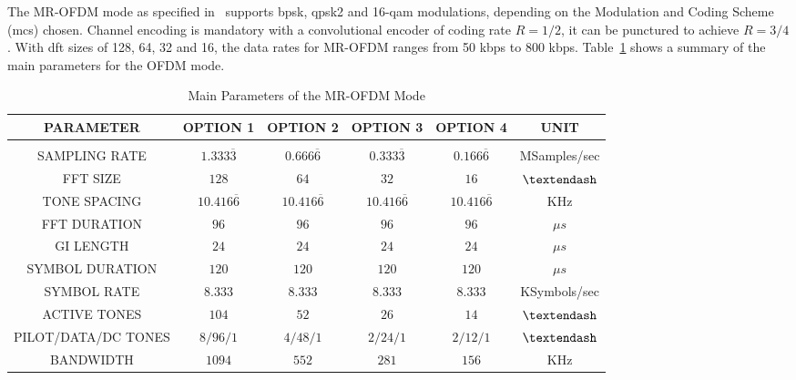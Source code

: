 The MR-OFDM mode as specified in~\cite{sun_std_2012} supports \ac{bpsk}, \ac{qpsk2} and 16-\ac{qam} modulations, depending on the Modulation and Coding Scheme (\ac{mcs}) chosen. Channel encoding is mandatory with a convolutional encoder of coding rate $R =1/2$, it can be punctured to achieve $R = 3/4$. With  \ac{dft} sizes of 128, 64, 32 and 16, the data rates for MR-OFDM ranges from 50 kbps to 800 kbps. Table~\ref{table_mrofdm} shows a summary of the main parameters for the OFDM mode. 

\begin{table}[htb!]\footnotesize
\caption{Main Parameters of the MR-OFDM Mode}
\label{table_mrofdm}
\centering
\begin{tabular}{@{}c c c c c c}
\hline
\textbf{PARAMETER}	&\textbf{OPTION 1}	&\textbf{OPTION 2}	&\textbf{OPTION 3}	&\textbf{OPTION 4}	&\textbf{UNIT}\\
\hline\\
SAMPLING RATE		&$1.333\overline{3}$	&$0.666\overline{6}$	&$0.333\overline{3}$ 	&$0.166\overline{6}$	&MSamples/sec\\
FFT SIZE		&$128$			&$64$			&$32$			&$16$			&$\textendash$\\
TONE SPACING		&$10.416\overline{6}$	&$10.416\overline{6}$	&$10.416\overline{6}$	&$10.416\overline{6}$	&KHz\\
FFT DURATION		&$96$			&$96$			&$96$			&$96$			&$\mu s$\\
GI  LENGTH		&$24$			&$24$			&$24$			&$24$			&$\mu s$\\
SYMBOL DURATION		&$120$			&$120$			&$120$			&$120$			&$\mu s$\\
SYMBOL RATE		&$8.333$		&$8.333$		&$8.333$		&$8.333$		&KSymbols/sec\\
ACTIVE TONES		&$104$			&$52$			&$26$			&$14$			&$\textendash$\\
PILOT/DATA/DC TONES	&$8/96/1$		&$4/48/1$		&$2/24/1$		&$2/12/1$		&$\textendash$\\
BANDWIDTH 		&$1094$ 		&$552$			&$281$			&$156$			&KHz\\
\hline
\end{tabular}
\end{table}



